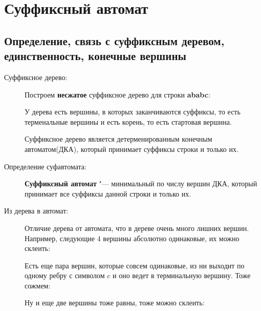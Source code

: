 ﻿\date{September 15, 2016}
\author{Chernikova Olga}

\section{Суффиксный автомат}
\subsection{Определение, связь с суффиксным деревом, единственность, конечные вершины}
\begin{description}
    \item[Суффиксное дерево:]
    Построем \textbf{несжатое} суффиксное дерево для строки \textbf{ababc}:
    

    У дерева есть вершины, в которых заканчиваются суффиксы, то есть
    терменальные вершины и есть корень, то есть стартовая вершина. 

    \begin{Rem}
    Суффиксное дерево является детерменированным конечным автоматом(ДКА), 
    который принимает суффиксы строки и только их. 
    \end{Rem}

    \item[Определение суфавтомата:]
    \begin{Def}
    \textbf{Суффиксный автомат} "--- минимальный по числу вершин ДКА, 
    который принимает все суффиксы данной строки и только их.
    \end{Def}

    \item[Из дерева в автомат:]
    Отличие дерева от автомата, что в дереве очень много лишних вершин. 
    Например, следующие 4 вершины абсолютно одинаковые, их можно склеить:
   

    Есть еще пара вершин, которые совсем одинаковые, из ни выходит по одному ребру 
    с символом $c$ и оно ведет в терминальную вершину. Тоже сожмем:
    
    
    Ну и еще две вершины тоже равны, тоже можно склеить:



\end{description}
